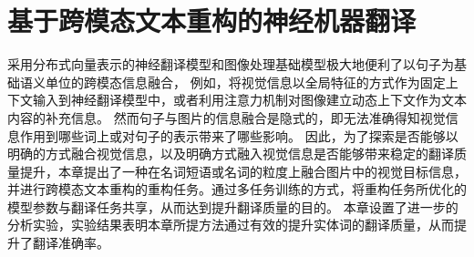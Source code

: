 \chapter{基于跨模态文本重构的神经机器翻译}

% 


采用分布式向量表示的神经翻译模型和图像处理基础模型极大地便利了以句子为基础语义单位的跨模态信息融合，
例如，将视觉信息以全局特征的方式作为固定上下文输入到神经翻译模型中，或者利用注意力机制对图像建立动态上下文作为文本内容的补充信息。
然而句子与图片的信息融合是隐式的，即无法准确得知视觉信息作用到哪些词上或对句子的表示带来了哪些影响。
因此，为了探索是否能够以明确的方式融合视觉信息，以及明确方式融入视觉信息是否能够带来稳定的翻译质量提升，本章提出了一种在名词短语或名词的粒度上融合图片中的视觉目标信息，并进行跨模态文本重构的重构任务。通过多任务训练的方式，将重构任务所优化的模型参数与翻译任务共享，从而达到提升翻译质量的目的。
本章设置了进一步的分析实验，实验结果表明本章所提方法通过有效的提升实体词的翻译质量，从而提升了翻译准确率。

